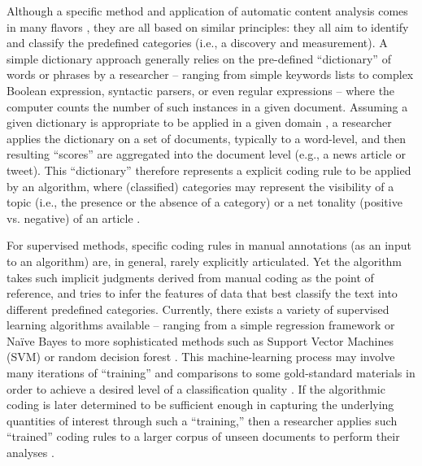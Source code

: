 \documentclass[man, 12pt, a4paper, nolmodern, noextraspace]{apa6}
\begin{document}
    Although a specific method and application of automatic content analysis comes in many flavors \parencites[for a broad overview, see:][]{Boumans_Trilling_2016, grimmer2013text}, they are all based on similar principles: they all aim to identify and classify the predefined categories (i.e., a discovery and measurement). A simple dictionary approach generally relies on the pre-defined “dictionary” of words or phrases by a researcher -- ranging from simple keywords lists to complex Boolean expression, syntactic parsers, or even regular expressions -- where the computer counts the number of such instances in a given document. Assuming a given dictionary is appropriate to be applied in a given domain \parencite{Boumans_Trilling_2016, gonzalez2015signals}, a researcher applies the dictionary on a set of documents, typically to a word-level, and then resulting \enquote{scores} are aggregated into the document level (e.g., a news article or tweet). This \enquote{dictionary} therefore represents a explicit coding rule to be applied by an algorithm, where (classified) categories may represent the visibility of a topic (i.e., the presence or the absence of a category) or a net tonality (positive vs. negative) of an article \parencites[e.g.,][]{Aaldering2016, YoungSoroka2012, boomgaaden2009, gonzalez2015signals, Rooduijn2011}. 
    
    For supervised methods, specific coding rules in manual annotations (as an input to an algorithm) are, in general, rarely explicitly articulated. Yet the algorithm takes such implicit judgments derived from manual coding as the point of reference, and tries to infer the features of data that best classify the text into different predefined categories. Currently, there exists a variety of supervised learning algorithms available -- ranging from a simple regression framework or Naïve Bayes to more sophisticated methods such as Support Vector Machines (SVM) or random decision forest \parencites[for an overview, see][]{hindman2015building}. This machine-learning process may involve many iterations of \enquote{training} and comparisons to some gold-standard materials in order to achieve a desired level of a classification quality \parencites[e.g.,][]{scharkow2013thematic}. If the algorithmic coding is later determined to be sufficient enough in capturing the underlying quantities of interest through such a \enquote{training,} then a researcher applies such \enquote{trained} coding rules to a larger corpus of unseen documents to perform their analyses \parencites[e.g.,][]{burscher2015using, burscher2014teaching, scharkow2013thematic, gonzalez2015signals}.    
    
\end{document}
